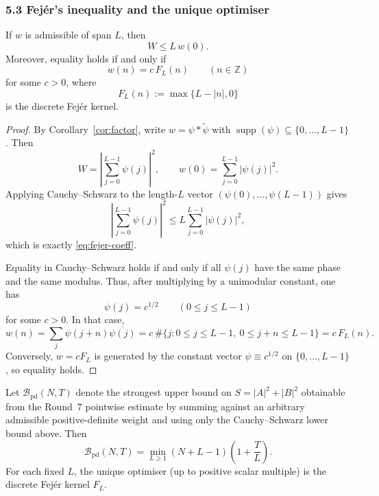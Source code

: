 \subsubsection{5.3 Fej\'er's inequality and the unique optimiser}

\begin{lemma}
\label{lem:fejer-ineq}
If $w$ is admissible of span $L$, then
\begin{equation}
\label{eq:fejer-coeff}
W\le L\,w(0).
\end{equation}
Moreover, equality holds if and only if
\[
w(n)=c\,F_L(n)
\qquad (n\in\mathbb Z)
\]
for some $c>0$, where
\[
F_L(n):=\max\{L-|n|,0\}
\]
is the discrete Fej\'er kernel.
\end{lemma}

\begin{proof}
By Corollary~\ref{cor:factor}, write $w=\psi*\widetilde\psi$ with $\operatorname{supp}(\psi)\subseteq\{0,\dots,L-1\}$.
Then
\[
W=\left|\sum_{j=0}^{L-1}\psi(j)\right|^2,
\qquad
w(0)=\sum_{j=0}^{L-1}|\psi(j)|^2.
\]
Applying Cauchy--Schwarz to the length-$L$ vector $(\psi(0),\dots,\psi(L-1))$ gives
\[
\left|\sum_{j=0}^{L-1}\psi(j)\right|^2\le L\sum_{j=0}^{L-1}|\psi(j)|^2,
\]
which is exactly \eqref{eq:fejer-coeff}.

Equality in Cauchy--Schwarz holds if and only if all $\psi(j)$ have the same phase and the same modulus.  Thus, after multiplying by a unimodular constant, one has
\[
\psi(j)=c^{1/2}
\qquad (0\le j\le L-1)
\]
for some $c>0$.  In that case,
\[
w(n)=\sum_j \psi(j+n)\overline{\psi(j)}=c\,\#\{j:0\le j\le L-1,\ 0\le j+n\le L-1\}=c\,F_L(n).
\]
Conversely, $w=cF_L$ is generated by the constant vector $\psi\equiv c^{1/2}$ on $\{0,\dots,L-1\}$, so equality holds.
\end{proof}

\begin{theorem}
\label{thm:universal-barrier}
Let $\mathcal B_{\mathrm{pd}}(N,T)$ denote the strongest upper bound on $S=|A|^2+|B|^2$ obtainable from the Round~7 pointwise estimate by summing against an arbitrary admissible positive-definite weight and using only the Cauchy--Schwarz lower bound above.  Then
\begin{equation}
\label{eq:Bpd}
\mathcal B_{\mathrm{pd}}(N,T)=\min_{L\ge 1}(N+L-1)\left(1+\frac{T}{L}\right).
\end{equation}
For each fixed $L$, the unique optimiser (up to positive scalar multiple) is the discrete Fej\'er kernel $F_L$.
\end{theorem}

